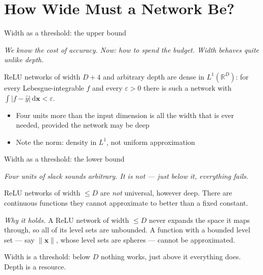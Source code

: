 \documentclass[aspectratio=169, 11pt]{beamer}
\newcommand{\bridge}[1]{%
  {\scriptsize\itshape\color{mcMuted} #1\par}\vspace{0.35em}}
\newcommand{\src}[3]{}      %
\begin{document}
\section{How Wide Must a Network Be?}

\begin{frame}{Width as a threshold: the upper bound}
  \src{lu2017}{section}{3}
  \bridge{We know the cost of accuracy. Now: how to spend the budget.
  Width behaves quite unlike depth.}
  \vspace{0.3em}
  \begin{theorem}
    {\small ReLU networks of width $D+4$ and \alert{arbitrary depth} are
    dense in $L^{1}(\mathbb{R}^{D})$: for every Lebesgue-integrable $f$
    and every $\varepsilon>0$ there is such a network with
    $\int|f-\hat y|\,\mathrm{d}\mathbf{x}<\varepsilon$.}
  \end{theorem}
  \vspace{0.5em}
  {\small
  \begin{itemize}\setlength{\itemsep}{4pt}
    \item Four units more than the input dimension is \alert{all} the
          width that is ever needed, provided the network may be deep
    \item Note the norm: density in $L^{1}$, not uniform
          approximation
  \end{itemize}}
\end{frame}

\begin{frame}{Width as a threshold: the lower bound}
  \src{hanin2017}{section}{3}
  \src{johnson2019}{section}{4}
  \bridge{Four units of slack sounds arbitrary. It is not --- just below
  it, everything fails.}
  \vspace{0.2em}
  \begin{theorem}
    {\small ReLU networks of width \alert{$\leq D$} are \emph{not}
    universal, however deep. There are continuous functions they cannot
    approximate to better than a fixed constant.}
  \end{theorem}
  \vspace{0.3em}
  {\small
  \emph{Why it holds.} A ReLU network of width $\leq D$ never expands
  the space it maps through, so all of its \alert{level sets are
  unbounded}. A function with a bounded level set --- say
  $\lVert\mathbf{x}\rVert$, whose level sets are spheres --- cannot be
  approximated.}
  \vspace{0.25em}
  \begin{redhighlight}
    {\small \alert{Width is a threshold}: below $D$ nothing works, just
    above it everything does. \alert{Depth is a resource}.}
  \end{redhighlight}
\end{frame}
\end{document}
